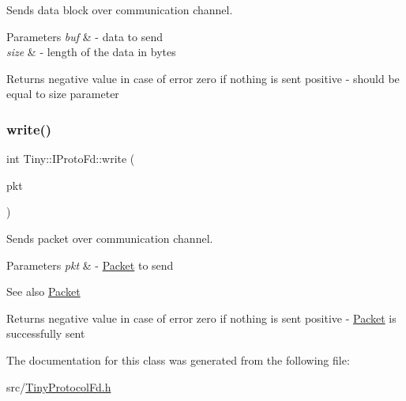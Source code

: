 Sends data block over communication channel. 
\begin{DoxyParams}{Parameters}
{\em buf} & -\/ data to send \\
\hline
{\em size} & -\/ length of the data in bytes \\
\hline
\end{DoxyParams}
\begin{DoxyReturn}{Returns}
negative value in case of error zero if nothing is sent positive -\/ should be equal to size parameter 
\end{DoxyReturn}
\mbox{\label{classTiny_1_1IProtoFd_aa822a1dec320e6edc70a84699371fe81}} 
\subsubsection{\texorpdfstring{write()}{write()}\hspace{0.1cm}{\footnotesize\ttfamily [2/2]}}
{\footnotesize\ttfamily int Tiny\+::\+I\+Proto\+Fd\+::write (\begin{DoxyParamCaption}\item[{\hyperlink{classTiny_1_1IPacket}{I\+Packet} \&}]{pkt }\end{DoxyParamCaption})}

Sends packet over communication channel. 
\begin{DoxyParams}{Parameters}
{\em pkt} & -\/ \hyperlink{classTiny_1_1Packet}{Packet} to send \\
\hline
\end{DoxyParams}
\begin{DoxySeeAlso}{See also}
\hyperlink{classTiny_1_1Packet}{Packet} 
\end{DoxySeeAlso}
\begin{DoxyReturn}{Returns}
negative value in case of error zero if nothing is sent positive -\/ \hyperlink{classTiny_1_1Packet}{Packet} is successfully sent 
\end{DoxyReturn}


The documentation for this class was generated from the following file\+:\begin{DoxyCompactItemize}
\item 
src/\hyperlink{TinyProtocolFd_8h}{Tiny\+Protocol\+Fd.\+h}\end{DoxyCompactItemize}
